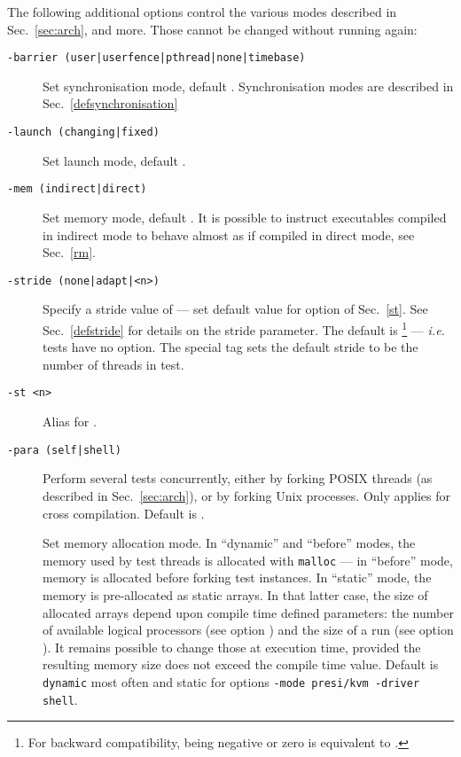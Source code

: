 The following additional options control the various modes described
in Sec.~\ref{sec:arch}, and more.
Those cannot be changed without running \litmus{} again:
\begin{description}
\item[{\tt -barrier (user|userfence|pthread|none|timebase)}] Set synchronisation mode, default . Synchronisation modes are described
in Sec.~\ref{defsynchronisation}
\item[{\tt -launch (changing|fixed)}] Set launch mode,
default .
\item[{\tt -mem (indirect|direct)}] Set memory mode,
default .
It is possible to instruct executables compiled in indirect mode
to behave almost as if compiled in direct mode, see Sec.~\ref{rm}.
\item[{\tt -stride (none|adapt|<n>)}]
Specify a stride value of  --- set default value for option  of Sec.~\ref{st}. See Sec.~\ref{defstride} for details on the stride parameter.
The default is \footnote{For backward compatibility,  being negative or zero is equivalent to .}
--- \emph{i.e.} tests have no
 option. The special tag  sets the default
stride to be the number of threads in test.

\item[{\tt -st <n>}] Alias for .
\item[{\tt -para (self|shell)}]
Perform several tests concurrently, either by forking POSIX
threads (as described in Sec.~\ref{sec:arch}), or by forking
Unix processes. Only applies for cross compilation.
Default is .
\item[]
Set memory allocation mode. In ``dynamic'' and ``before'' modes, the memory
used by test threads is allocated with \texttt{malloc} --- in ``before'' mode,
memory is allocated before forking test instances.
In ``static'' mode, the memory is pre-allocated as static arrays.
In that latter case, the size of allocated arrays depend upon
compile time defined parameters: the number of available logical processors
(see option )
and the size of a run (see option ).
It remains possible to change those at execution time, provided
the resulting memory size does not exceed the compile time value.
Default is \texttt{dynamic} most often and
static for options \texttt{-mode presi/kvm -driver shell}.


\end{description}

